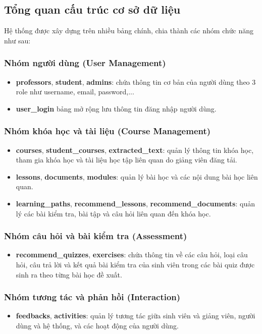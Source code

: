\subsection{Tổng quan cấu trúc cơ sở dữ liệu}
Hệ thống được xây dựng trên nhiều bảng chính, chia thành các nhóm chức năng như sau:

\subsubsection{Nhóm người dùng (User Management)}
\begin{itemize}
    \item \textbf{professors}, \textbf{student}, \textbf{admins}: chứa thông tin cơ bản của người dùng theo 3 role như username, email, password,...
    \item \textbf{user\_login}\: bảng mở rộng lưu thông tin đăng nhập người dùng.
\end{itemize}

\subsubsection{Nhóm khóa học và tài liệu (Course Management)}
\begin{itemize}
    \item \textbf{courses}, \textbf{student\_courses}, \textbf{extracted\_text}: quản lý thông tin khóa học, tham gia khóa học và tài liệu học tập liên quan do giảng viên đăng tải.
    \item \textbf{lessons}, \textbf{documents}, \textbf{modules}: quản lý bài học và các nội dung bài học liên quan.
    \item \textbf{learning\_paths}, \textbf{recommend\_lessons}, \textbf{recommend\_documents}: quản lý các bài kiểm tra, bài tập và câu hỏi liên quan đến khóa học.
\end{itemize}

\subsubsection{Nhóm câu hỏi và bài kiểm tra (Assessment)}
\begin{itemize}
    \item \textbf{recommend\_quizzes}, \textbf{exercises}: chứa thông tin về các câu hỏi, loại câu hỏi, câu trả lời và kết quả bài kiểm tra của sinh viên trong các bài quiz được sinh ra theo từng bài học đề xuất.
\end{itemize}

\subsubsection{Nhóm tương tác và phản hồi (Interaction)}
\begin{itemize}
    \item  \textbf{feedbacks}, \textbf{activities}: quản lý tương tác giữa sinh viên và giảng viên, người dùng và hệ thống, và các hoạt động của người dùng.
\end{itemize}

